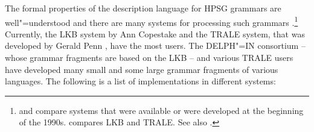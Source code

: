 The formal properties of the description language for HPSG grammars are well"=understood and there are
many systems for processing such grammars
\citep*{DS91a,%
DD93a-u,%
PV91a-u,%
DISCO94,%
%
Erbach95a,%
Schuetz96,STRD96a-u,%
SRTD96a,%
UBCCDDEEMMO-96a,Babel,Mueller2004b,%
CP96,PC99,%
GMG97a-u,%
Copestake2002a,%
Callmeier00a-u,%
Dahlloef2003a-u,%
MPR2002a-u,Penn2004a-u,%
Mueller2007b,%
Sato2008a-u,%
Kaufmann2009a-u,%
Slayden2012a-u,%
CP2012a-u,%
Packard2015a-u%
}.\footnote{%
\citet{UBCCDDEEMMO-96a} and \citet{Bolc:Czuba:ea:96a-u} compare systems that were available or were
developed at the beginning of the 1990s. \citet{MelnikHandWritten}
compares LKB and TRALE. See also .
}
Currently, the LKB system by Ann Copestake and the TRALE
system, that was developed by Gerald Penn \citep*{MPR2002a-u,Penn2004a-u}, have the most users. The
DELPH"=IN consortium -- whose grammar fragments are based on the LKB -- and various TRALE users have developed many small and some
large grammar fragments of various languages. The following is a list of implementations in different systems:
